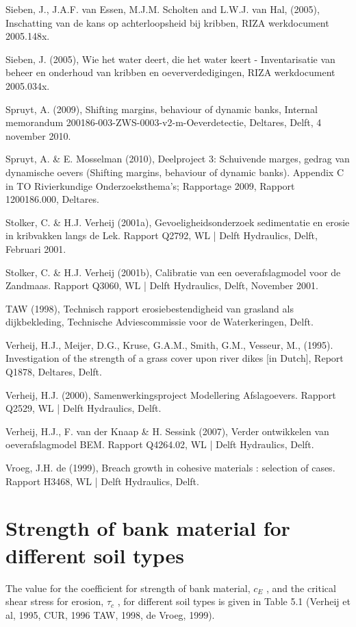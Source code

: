 Sieben, J., J.A.F. van Essen, M.J.M. Scholten and L.W.J. van Hal, (2005), Inschatting van de kans op achterloopsheid bij kribben, RIZA werkdocument 2005.148x.

Sieben, J. (2005), Wie het water deert, die het water keert - Inventarisatie van beheer en onderhoud van kribben en oeververdedigingen, RIZA werkdocument 2005.034x.

Spruyt, A. (2009), Shifting margins, behaviour of dynamic banks, Internal memorandum 200186-003-ZWS-0003-v2-m-Oeverdetectie, Deltares, Delft, 4 november 2010.

Spruyt, A. \& E. Mosselman (2010), Deelproject 3: Schuivende marges, gedrag van dynamische oevers (Shifting margins, behaviour of dynamic banks).
Appendix C in TO Rivierkundige Onderzoeksthema's; Rapportage 2009, Rapport 1200186.000, Deltares.

Stolker, C. \& H.J. Verheij (2001a), Gevoeligheidsonderzoek sedimentatie en erosie in kribvakken langs de Lek. Rapport Q2792, WL | Delft Hydraulics, Delft, Februari 2001.

Stolker, C. \& H.J. Verheij (2001b), Calibratie van een oeverafslagmodel voor de Zandmaas. Rapport Q3060, WL | Delft Hydraulics, Delft, November 2001.

TAW (1998), Technisch rapport erosiebestendigheid van grasland als dijkbekleding, Technische Adviescommissie voor de Waterkeringen, Delft.

Verheij, H.J., Meijer, D.G., Kruse, G.A.M., Smith, G.M., Vesseur, M., (1995). Investigation of the strength of a grass cover upon river dikes [in Dutch], Report Q1878, Deltares, Delft.

Verheij, H.J. (2000), Samenwerkingsproject Modellering Afslagoevers. Rapport Q2529, WL | Delft Hydraulics, Delft.

Verheij, H.J., F. van der Knaap \& H. Sessink (2007), Verder ontwikkelen van oeverafslagmodel BEM. Rapport Q4264.02, WL | Delft Hydraulics, Delft.

Vroeg, J.H. de (1999), Breach growth in cohesive materials : selection of cases. Rapport H3468, WL | Delft Hydraulics, Delft.


\chapter{Strength of bank material for different soil types}

The value for the coefficient for strength of bank material, $c_E$ , and the critical shear stress for erosion, $\tau_c$ , for different soil types is given in Table 5.1 (Verheij et al, 1995, CUR, 1996 TAW, 1998, de Vroeg, 1999).

